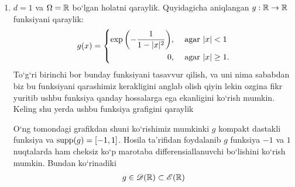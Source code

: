 \begin{example}
    \begin{enumerate}
        \item $d=1$ va $\Omega=\mathbb{R}$ bo`lgan holatni qaraylik. Quyidagicha aniqlangan $g:\mathbb{R}\rightarrow \mathbb{R}$ funksiyani qaraylik:
        \begin{equation}
            g(x)=\left\{\begin{aligned}
                \exp\left(-\frac{1}{1-\lvert x\rvert^2}\right)&, & \textnormal{ agar } & \lvert x\rvert <1 \\
                 0 &, & \textnormal{ agar } & \lvert x\rvert \ge 1.
            \end{aligned}\right. 
        \end{equation} 
    To`g`ri birinchi bor bunday funksiyani tasavvur qilish, va uni nima sababdan biz bu funksiyani qarashimiz kerakligini anglab olish qiyin lekin ozgina fikr yuritib ushbu funksiya qanday hossalarga ega ekanligini ko`rish mumkin. Keling shu yerda ushbu funksiya grafigini qaraylik
    
    \noindent
    \begin{minipage}{0.89\textwidth}
    \begin{minipage}[b]{0.5\textwidth}
    O`ng tomondagi grafikdan shuni ko`\-ri\-shi\-miz mumkinki $g$ kom\-pakt das\-tak\-li funksiya va $\operatorname{supp}(g)=[-1,1]$. Hosila ta'rifidan foydalanib $g$ funk\-si\-ya $-1$ va $1$ nuq\-ta\-lar\-da ham cheksiz ko`p ma\-ro\-ta\-ba dif\-fe\-ren\-si\-al\-la\-nuv\-chi bo`\-li\-shi\-ni ko`rish mumkin. Bundan ko`rinadiki 
    \begin{align*} 
        g\in \mathscr{D}(\mathbb{R})\subset\mathscr{E}(\mathbb{R})
    \end{align*}
    \end{minipage}
    \hspace{0.02\textwidth}
    \begin{minipage}[b]{0.45\textwidth}
        \begin{figure}[H]
            \centering
            \label{fig:convkernel}
        

\end{figure}
\end{minipage}
\end{minipage}
\end{enumerate}
\end{example}
